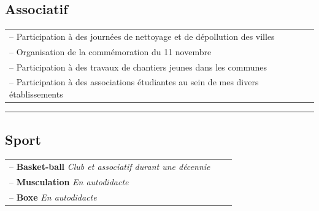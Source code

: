 \documentclass[11pt, a4paper]{article}
\begin{document}
\subsection*{Associatif}

\begin{tabularx}{\textwidth}{@{}l X r@{}}
    -- Participation à des journées de nettoyage et de dépollution des villes 
    \\
    -- Organisation de la commémoration du 11 novembre
    \\
    -- Participation à des travaux de chantiers jeunes dans les communes 
    \\
    -- Participation à des associations étudiantes au sein de mes divers établissements 

\end{tabularx}

\vspace{2pt}
\rule{\textwidth}{0.4pt}  %

\subsection*{Sport}

\begin{tabularx}{\textwidth}{@{}l X r@{}}
    -- \textbf{Basket-ball} \quad \textit{Club et associatif durant une décennie}
    \\
    -- \textbf{Musculation} \quad \textit{En autodidacte}
    \\
    -- \textbf{Boxe} \quad \textit{En autodidacte}
\end{tabularx}
\end{document}
